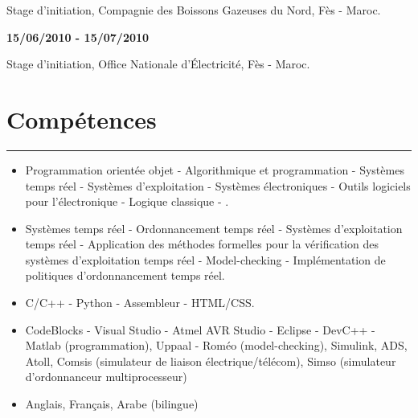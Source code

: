 		Stage d’initiation, Compagnie des Boissons Gazeuses du Nord, Fès - Maroc.

\vspace{0.4cm}
\hspace{-0.7cm}\textbf{15/06/2010 - 15/07/2010}

		Stage d’initiation, Office Nationale d’Électricité, Fès - Maroc.



\section{Compétences}
\vspace{-0.6cm}
\hspace{0.7cm}\textcolor{myblue}{\rule{15cm}{1mm}}

\vspace{0.5cm}

\begin{minipage}{0.08\textwidth}
	\hspace{0.1cm}
\end{minipage}
\begin{minipage}{0.9\textwidth}
	\begin{itemize}[label=\textbf{Enseignement}]
		\item	Programmation orientée objet - Algorithmique et programmation - Systèmes temps réel - Systèmes d'exploitation - Systèmes électroniques - Outils logiciels pour l'électronique - Logique classique - .
	\end{itemize}
	
	\begin{itemize}[label=\textbf{Recherche}]
		\item	Systèmes temps réel - Ordonnancement temps réel - Systèmes d'exploitation temps réel - Application des méthodes formelles pour la vérification des systèmes d'exploitation temps réel - Model-checking - Implémentation de politiques d'ordonnancement temps réel.
	\end{itemize}
	
	\begin{itemize}[label=\textbf{Langages}]
		\item	C/C++ - Python - Assembleur - HTML/CSS.
	\end{itemize}
	
	\begin{itemize}[label=\textbf{Logiciels}]
		\item CodeBlocks - Visual Studio - Atmel AVR Studio - Eclipse - DevC++ - Matlab (programmation), Uppaal - Roméo (model-checking), Simulink, ADS, Atoll, Comsis (simulateur de liaison électrique/télécom), Simso (simulateur d'ordonnanceur multiprocesseur)
	\end{itemize}
	
	\begin{itemize}[label=\textbf{Langues}]
		\item	Anglais, Français, Arabe (bilingue)
	\end{itemize}
	
	
	
\end{minipage}

